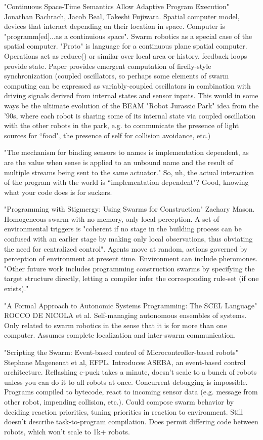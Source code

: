 \documentclass[]{article}
\begin{document}
"Continuous Space-Time Semantics Allow Adaptive Program Execution" \cite{bachrach2007continuous} Jonathan Bachrach, Jacob Beal, Takeshi Fujiwara. Spatial computer model, devices that interact depending on their location in space. Computer is "programm[ed]...as a continuious space". Swarm robotics as a special case of the spatial computer. "Proto" is language for a continuous plane spatial computer. Operations act as reduce() or similar over local area or history, feedback loops provide state. Paper provides emergent computation of firefly-style synchronization (coupled oscillators, so perhaps some elements of swarm computing can be expressed as variably-coupled oscillators in combination with driving signals derived from internal states and sensor inputs. This would in some ways be the ultimate evolution of the BEAM "Robot Jurassic Park" idea from the '90s, where each robot is sharing some of its internal state via coupled oscillation with the other robots in the park, e.g. to communicate the presence of light sources for ``food", the presence of self for collision avoidance, etc.)

"The mechanism for binding sensors to names is implementation dependent, as are the value when sense is applied to an unbound name and the result of multiple streams being sent to the same actuator." So, uh, the actual interaction of the program with the world is ``implementation dependent"? Good, knowing what your code does is for suckers. 

"Programming with Stigmergy: Using Swarms for Construction" \cite{mason2003programming} Zachary Mason. Homogeneous swarm with no memory, only local perception. A set of environmental triggers is "coherent if no stage in the building process can be confused with an earlier stage by making only local observations, thus obviating the need for centralized control". Agents move at random, actions governed by perception of environment at present time. Environment can include pheromones.  "Other future work includes programming construction swarms by specifying the target structure directly, letting a compiler infer the corresponding rule-set (if one exists)."

"A Formal Approach to Autonomic Systems Programming: The SCEL Language" \cite{nicola2014formal} ROCCO DE NICOLA et al. Self-managing autonomous ensembles of systems. Only related to swarm robotics in the sense that it is for more than one computer. Assumes complete localization and inter-swarm communication. 

"Scripting the Swarm: Event-based control of Microcontroller-based robots" \cite{magnenat2008scripting} Stephane Magenenat et al, EFPL. Introduces ASEBA, an event-based control architecture. Reflashing e-puck takes a minute, doesn't scale to a bunch of robots unless you can do it to all robots at once. Concurrent debugging is impossible. Programs compiled to bytecode, react to incoming sensor data (e.g. message from other robot, impending collision, etc.). Could compose swarm behavior by deciding reaction priorities, tuning priorities in reaction to environment. Still doesn't describe task-to-program compilation. Does permit differing code between robots, which won't scale to 1k+ robots. 
\end{document}

